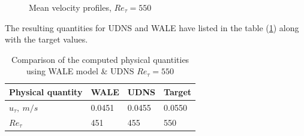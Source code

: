 \begin{figure}[h!]
\begin{minipage}[b]{0.5\textwidth}
\end{minipage}
%
\begin{minipage}[b]{0.5\textwidth}
\end{minipage}
\caption{Mean velocity profiles, $Re_\tau = 550$}
\label{mean profiles 550}
\end{figure} 
%
The resulting quantities for UDNS and WALE have listed in the table (\ref{Global quantities results 550}) along with the target values.
%
\begin{table}[h!]
\begin{center}
\begin{tabular}{ p{3cm}|p{1.5cm}p{1.5cm}p{1.5cm}  } 
\hline
Physical quantity & WALE & UDNS & Target \\
  \hline
  \multirow{1}{6em}{$u_\tau,\ m/s$}  & 0.0451 & 0.0455 & 0.0550\\
  \hline
  \multirow{1}{6em}{$Re_\tau$} & 451 & 455 & 550\\
  \hline
\end{tabular}
\end{center}
\caption{Comparison of the computed physical quantities using WALE model \& UDNS $Re_\tau = 550$}
\label{Global quantities results 550}
\end{table}
